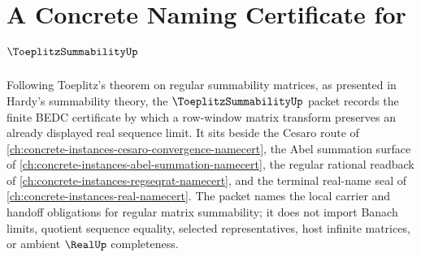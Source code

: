 \chapter{A Concrete Naming Certificate for $\ToeplitzSummabilityUp$}
\label{ch:concrete-instances-toeplitz-summability-namecert}

Following Toeplitz's theorem on regular summability matrices, as presented in Hardy's summability theory, the $\ToeplitzSummabilityUp$ packet records the finite BEDC certificate by which a row-window matrix transform preserves an already displayed real sequence limit. It sits beside the Cesaro route of \autoref{ch:concrete-instances-cesaro-convergence-namecert}, the Abel summation surface of \autoref{ch:concrete-instances-abel-summation-namecert}, the regular rational readback of \autoref{ch:concrete-instances-regseqrat-namecert}, and the terminal real-name seal of \autoref{ch:concrete-instances-real-namecert}. The packet names the local carrier and handoff obligations for regular matrix summability; it does not import Banach limits, quotient sequence equality, selected representatives, host infinite matrices, or ambient $\RealUp$ completeness.

